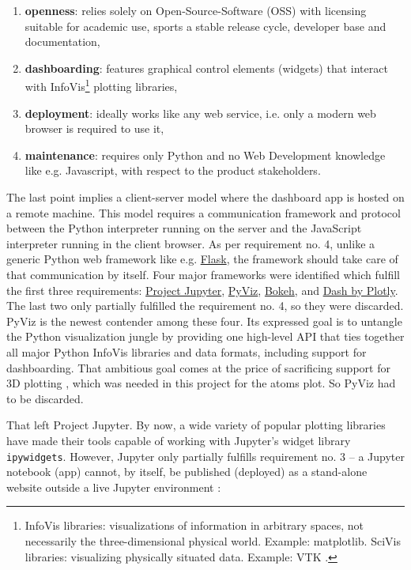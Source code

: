 \begin{enumerate}
\item \textbf{openness}: relies solely on Open-Source-Software (OSS) with
    licensing suitable for academic use, sports a stable release cycle, developer
    base and documentation,
\item \textbf{dashboarding}: features graphical control elements (widgets) that
    interact with InfoVis\footnote{InfoVis libraries: visualizations of
      information in arbitrary spaces, not necessarily the three-dimensional
      physical world. Example: matplotlib. SciVis libraries: visualizing
      physically situated data. Example: VTK \cite{python-viz-2018}.} plotting
    libraries,
\item \textbf{deployment}: ideally works like any web service, i.e. only a
    modern web browser is required to use it,
\item \textbf{maintenance}: requires only Python and no Web Development
    knowledge like e.g. Javascript, with respect to the product stakeholders.
\end{enumerate}

The last point implies a client-server model where the dashboard app is hosted
on a remote machine. This model requires a communication framework and protocol
between the Python interpreter running on the server and the JavaScript
interpreter running in the client browser. As per requirement no. 4, unlike a
generic Python web framework like e.g. \href{http://flask.pocoo.org/}{Flask},
the framework should take care of that communication by itself. Four major
frameworks were identified which fulfill the first three requirements:
\href{https://jupyter.org/}{Project Jupyter}, \href{http://pyviz.org/}{PyViz},
\href{https://bokeh.pydata.org/en/latest/}{Bokeh}, and
\href{https://plot.ly/products/dash/}{Dash by Plotly}. The last two only
partially fulfilled the requirement no. 4, so they were discarded. PyViz is the
newest contender among these four. Its expressed goal is to untangle the Python
visualization jungle by providing one high-level API that ties together all
major Python InfoVis libraries and data formats, including support for
dashboarding. That ambitious goal comes at the price of sacrificing support for
3D plotting \cite{pyviz-faq}, which was needed in this project for the atoms
plot. So PyViz had to be discarded.

That left Project Jupyter. By now, a wide variety of popular plotting libraries
have made their tools capable of working with Jupyter's widget library
\texttt{ipywidgets}. However, Jupyter only partially fulfills requirement no. 3
-- a Jupyter notebook (app) cannot, by itself, be published (deployed) as a
stand-alone website outside a live Jupyter environment \cite{python-viz-2018}:


